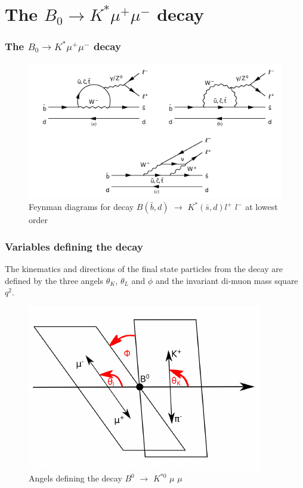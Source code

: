 \documentclass{beamer}
\begin{document}




\section{The $B_0 \rightarrow K^* \mu^+ \mu^-$ decay }

\begin{frame}
  \frametitle{The $B_0 \rightarrow K^* \mu^+ \mu^-$ decay}

  \begin{figure}[H]
 \centering
 \includegraphics[width=0.8\linewidth]{figures/KstarFeynman}
 \caption{Feynman diagrams for decay $B(\bar{b},d)$ $\rightarrow$ $ K^*(\bar{s},d) l^+$ $l^-$ at lowest order}
 \label{fig:Feynman}
\end{figure}

\end{frame}

\begin{frame}
  \frametitle{Variables defining the decay}

The kinematics and directions of the final state particles from the decay are defined by the three angels $\theta_K$, $\theta_L$ and $\phi$ and the invariant di-muon mass square $q^2$.

  \begin{figure}
   \includegraphics[width= 0.8\linewidth]{figures/angels}
   \caption{Angels defining the decay $B^0$ $\rightarrow$ $K^{*0}$ $\mu$ $\mu$}
  \end{figure}

\end{frame}
\end{document}
